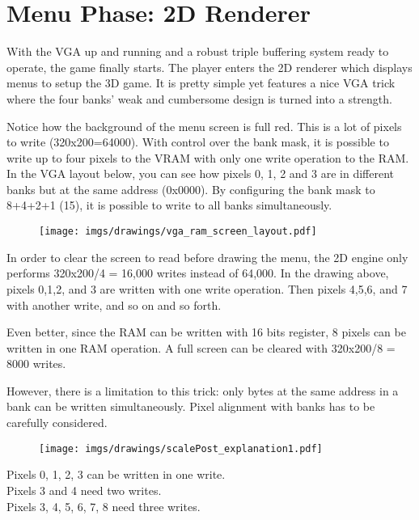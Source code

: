\section{Menu Phase: 2D Renderer}
With the VGA up and running and a robust triple buffering system ready to operate, the game finally starts. The player enters the 2D renderer which displays menus to setup the 3D game. It is pretty simple yet features a nice VGA trick where the four banks' weak and cumbersome design is turned into a strength.
\par
\begin{figure}[H]
\centering
{}
\end{figure}
\par

Notice how the background of the menu screen is full red. This is a lot of pixels to write (320x200=64000). With control over the bank mask, it is possible to write up to four pixels to the VRAM with only one write operation to the RAM. In the VGA layout below, you can see how pixels 0, 1, 2 and 3 are in different banks but at the same address (0x0000). By configuring the bank mask to 8+4+2+1 (15), it is possible to write to all banks simultaneously.\\
\par
\begin{figure}[H]
\centering
\texttt{[image: imgs/drawings/vga\_ram\_screen\_layout.pdf]}
\end{figure}

\par
In order to clear the screen to read before drawing the menu, the 2D engine only performs 320x200/4 = 16,000 writes instead of 64,000. In the drawing above, pixels 0,1,2, and 3 are written with one write operation. Then pixels 4,5,6, and 7 with another write, and so on and so forth.\\
\par
Even better, since the RAM can be written with 16 bits register, 8 pixels can be written in one RAM operation. A full screen can be cleared with 320x200/8 = 8000 writes.
\par
\begin{minipage}{\textwidth}

\end{minipage}
However, there is a limitation to this trick: only bytes at the same address in a bank can be written simultaneously. Pixel alignment with banks has to be carefully considered.\
\par
\begin{figure}[H]
\centering
 \texttt{[image: imgs/drawings/scalePost\_explanation1.pdf]}
 \end{figure}
Pixels 0, 1, 2, 3 can be written in one write.\\
Pixels 3 and 4 need two writes.\\
Pixels 3, 4, 5, 6, 7, 8 need three writes.\\


